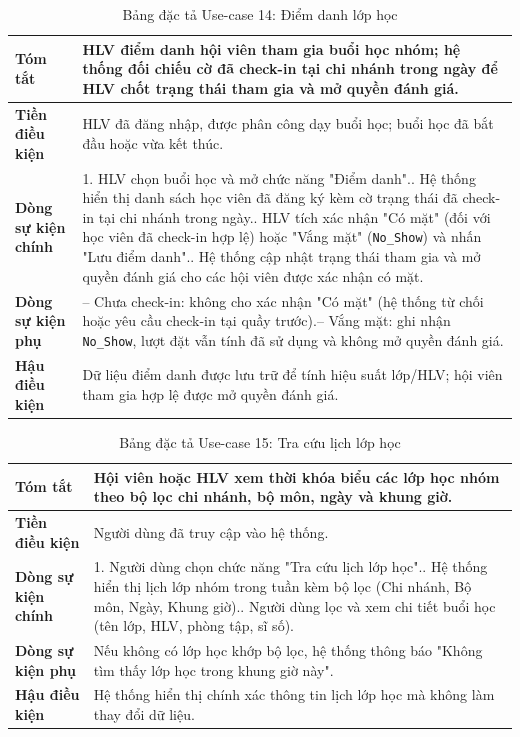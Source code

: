 \documentclass[a4paper,12pt]{article}
\begin{document}
\begin{table}[H]\centering\footnotesize
\begin{tabularx}{\textwidth}{|L{3.2cm}|Y|}
\hline \textbf{Tóm tắt} & HLV điểm danh hội viên tham gia buổi học nhóm; hệ thống đối chiếu cờ đã check-in tại chi nhánh trong ngày để HLV chốt trạng thái tham gia và mở quyền đánh giá. \\ \hline
\textbf{Tiền điều kiện} & HLV đã đăng nhập, được phân công dạy buổi học; buổi học đã bắt đầu hoặc vừa kết thúc. \\ \hline
\textbf{Dòng sự kiện chính} & 1. HLV chọn buổi học và mở chức năng "Điểm danh".. Hệ thống hiển thị danh sách học viên đã đăng ký kèm cờ trạng thái đã check-in tại chi nhánh trong ngày.. HLV tích xác nhận "Có mặt" (đối với học viên đã check-in hợp lệ) hoặc "Vắng mặt" (\texttt{No\_Show}) và nhấn "Lưu điểm danh".. Hệ thống cập nhật trạng thái tham gia và mở quyền đánh giá cho các hội viên được xác nhận có mặt. \\ \hline
\textbf{Dòng sự kiện phụ} & -- Chưa check-in: không cho xác nhận "Có mặt" (hệ thống từ chối hoặc yêu cầu check-in tại quầy trước).\newline -- Vắng mặt: ghi nhận \texttt{No\_Show}, lượt đặt vẫn tính đã sử dụng và không mở quyền đánh giá. \\ \hline
\textbf{Hậu điều kiện} & Dữ liệu điểm danh được lưu trữ để tính hiệu suất lớp/HLV; hội viên tham gia hợp lệ được mở quyền đánh giá. \\ \hline
\end{tabularx}
\caption{Bảng đặc tả Use-case 14: Điểm danh lớp học}
\end{table}

\begin{table}[H]\centering\footnotesize
\begin{tabularx}{\textwidth}{|L{3.2cm}|Y|}
\hline \textbf{Tóm tắt} & Hội viên hoặc HLV xem thời khóa biểu các lớp học nhóm theo bộ lọc chi nhánh, bộ môn, ngày và khung giờ. \\ \hline
\textbf{Tiền điều kiện} & Người dùng đã truy cập vào hệ thống. \\ \hline
\textbf{Dòng sự kiện chính} & 1. Người dùng chọn chức năng "Tra cứu lịch lớp học".. Hệ thống hiển thị lịch lớp nhóm trong tuần kèm bộ lọc (Chi nhánh, Bộ môn, Ngày, Khung giờ).. Người dùng lọc và xem chi tiết buổi học (tên lớp, HLV, phòng tập, sĩ số). \\ \hline
\textbf{Dòng sự kiện phụ} & Nếu không có lớp học khớp bộ lọc, hệ thống thông báo "Không tìm thấy lớp học trong khung giờ này". \\ \hline
\textbf{Hậu điều kiện} & Hệ thống hiển thị chính xác thông tin lịch lớp học mà không làm thay đổi dữ liệu. \\ \hline
\end{tabularx}
\caption{Bảng đặc tả Use-case 15: Tra cứu lịch lớp học}
\end{table}
\end{document}
